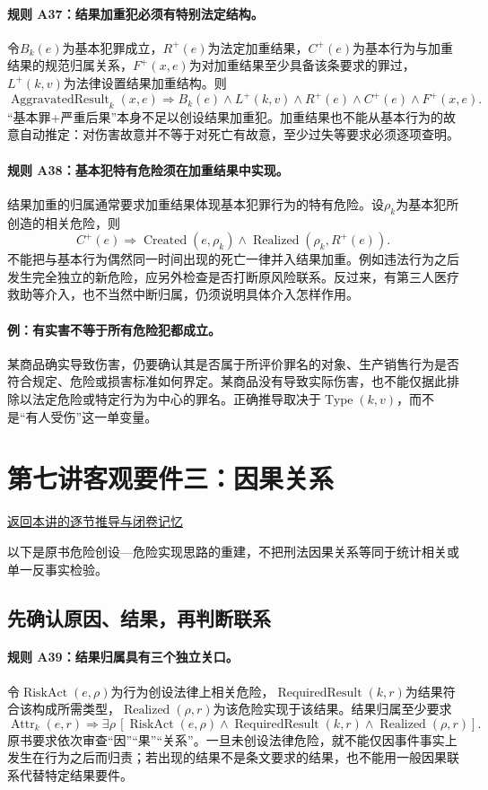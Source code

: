 \paragraph{规则 A37：结果加重犯必须有特别法定结构。}
令$B_k(e)$为基本犯罪成立，$R^+(e)$为法定加重结果，$C^+(e)$为基本行为与加重结果的规范归属关系，$F^+(x,e)$为对加重结果至少具备该条要求的罪过，$L^+(k,v)$为法律设置结果加重结构。则
\[
\operatorname{AggravatedResult}_k(x,e)
\Longrightarrow B_k(e)\land L^+(k,v)
\land R^+(e)\land C^+(e)\land F^+(x,e).
\]
“基本罪+严重后果”本身不足以创设结果加重犯。加重结果也不能从基本行为的故意自动推定：对伤害故意并不等于对死亡有故意，至少过失等要求必须逐项查明。

\paragraph{规则 A38：基本犯特有危险须在加重结果中实现。}
结果加重的归属通常要求加重结果体现基本犯罪行为的特有危险。设$\rho_k$为基本犯所创造的相关危险，则
\[
C^+(e)\Longrightarrow\operatorname{Created}(e,\rho_k)
\land\operatorname{Realized}(\rho_k,R^+(e)).
\]
不能把与基本行为偶然同一时间出现的死亡一律并入结果加重。例如违法行为之后发生完全独立的新危险，应另外检查是否打断原风险联系。反过来，有第三人医疗救助等介入，也不当然中断归属，仍须说明具体介入怎样作用。

\paragraph{例：有实害不等于所有危险犯都成立。}
某商品确实导致伤害，仍要确认其是否属于所评价罪名的对象、生产销售行为是否符合规定、危险或损害标准如何界定。某商品没有导致实际伤害，也不能仅据此排除以法定危险或特定行为为中心的罪名。正确推导取决于$\operatorname{Type}(k,v)$，而不是“有人受伤”这一单变量。

\section{第七讲\quad 客观要件三：因果关系}

\label{ref:lecture:07}

\noindent\hyperref[lecture:07]{返回本讲的逐节推导与闭卷记忆}

以下是原书危险创设—危险实现思路的重建，不把刑法因果关系等同于统计相关或单一反事实检验。

\subsection{先确认原因、结果，再判断联系}
\paragraph{规则 A39：结果归属具有三个独立关口。}
令$\operatorname{RiskAct}(e,\rho)$为行为创设法律上相关危险，$\operatorname{RequiredResult}(k,r)$为结果符合该构成所需类型，$\operatorname{Realized}(\rho,r)$为该危险实现于该结果。结果归属至少要求
\[
\operatorname{Attr}_k(e,r)
\Longrightarrow\exists\rho\,[\operatorname{RiskAct}(e,\rho)
\land\operatorname{RequiredResult}(k,r)
\land\operatorname{Realized}(\rho,r)].
\]
原书要求依次审查“因”“果”“关系”。一旦未创设法律危险，就不能仅因事件事实上发生在行为之后而归责；若出现的结果不是条文要求的结果，也不能用一般因果联系代替特定结果要件。

